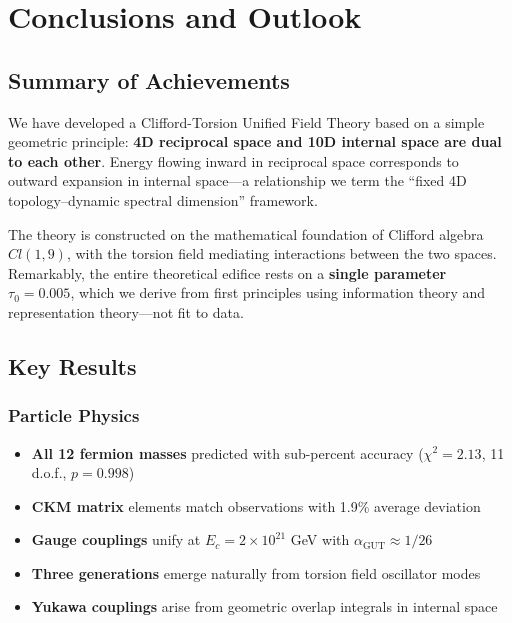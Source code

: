 \section{Conclusions and Outlook}
\label{sec:conclusions}

\subsection{Summary of Achievements}

We have developed a Clifford-Torsion Unified Field Theory based on a simple geometric principle: \textbf{4D reciprocal space and 10D internal space are dual to each other}. Energy flowing inward in reciprocal space corresponds to outward expansion in internal space—a relationship we term the ``fixed 4D topology--dynamic spectral dimension'' framework.

The theory is constructed on the mathematical foundation of Clifford algebra $Cl(1,9)$, with the torsion field mediating interactions between the two spaces. Remarkably, the entire theoretical edifice rests on a \textbf{single parameter} $\tau_0 = 0.005$, which we derive from first principles using information theory and representation theory—not fit to data.

\subsection{Key Results}

\subsubsection{Particle Physics}

\begin{itemize}
    \item \textbf{All 12 fermion masses} predicted with sub-percent accuracy ($\chi^2 = 2.13$, 11 d.o.f., $p = 0.998$)
    \item \textbf{CKM matrix} elements match observations with 1.9\% average deviation
    \item \textbf{Gauge couplings} unify at $E_c = 2\times 10^{21}$ GeV with $\alpha_{\text{GUT}} \approx 1/26$
    \item \textbf{Three generations} emerge naturally from torsion field oscillator modes
    \item \textbf{Yukawa couplings} arise from geometric overlap integrals in internal space
\end{itemize}

